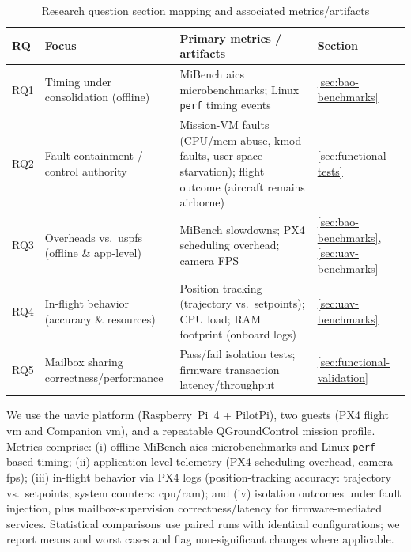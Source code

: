 \begin{table}[t]
  \centering
  \caption{Research question section mapping and associated metrics/artifacts}
  \label{tab:rq-map}
  \begingroup
  \footnotesize
  \setlength{\extrarowheight}{0.6ex}
  \begin{tabular}{@{}llp{6.8cm}l@{}}
  \toprule
  \textbf{RQ} & \textbf{Focus} & \textbf{Primary metrics / artifacts} & \textbf{Section} \\
  \midrule
  RQ1 & Timing under consolidation (offline) &
   MiBench \gls{aics} microbenchmarks; Linux \texttt{perf} timing events &
  \ref{sec:bao-benchmarks} \\
  RQ2 & Fault containment / control authority &
  Mission-VM faults (CPU/mem abuse, kmod faults, user-space starvation); flight outcome (aircraft remains airborne) &
  \ref{sec:functional-tests} \\
  RQ3 & Overheads vs.\ \gls{uspfs} (offline \& app-level) &
  MiBench slowdowns; PX4 scheduling overhead; camera FPS &
  \ref{sec:bao-benchmarks}, \ref{sec:uav-benchmarks} \\
  RQ4 & In-flight behavior (accuracy \& resources) &
  Position tracking (trajectory vs.\ setpoints); CPU load; RAM footprint (onboard logs) &
  \ref{sec:uav-benchmarks} \\
  RQ5 & Mailbox sharing correctness/performance &
  Pass/fail isolation tests; firmware transaction latency/throughput &
  \ref{sec:functional-validation} \\
  \bottomrule
  \end{tabular}
  \endgroup
\end{table}

We use the \gls{uavic} platform (Raspberry~Pi~4 + PilotPi), two guests (PX4 flight \gls{vm} and Companion \gls{vm}), and a repeatable QGroundControl mission profile. 
Metrics comprise: (i) offline MiBench \gls{aics} microbenchmarks and Linux \texttt{perf}-based timing; 
(ii) application-level telemetry (PX4 scheduling overhead, camera \gls{fps}); 
(iii) in-flight behavior via PX4 logs (position-tracking accuracy: trajectory vs.\ setpoints; system counters: \gls{cpu}/\gls{ram}); and 
(iv) isolation outcomes under fault injection, plus mailbox-supervision correctness/latency for firmware-mediated services. 
Statistical comparisons use paired runs with identical configurations; we report
means and worst cases and flag non-significant changes where applicable.


